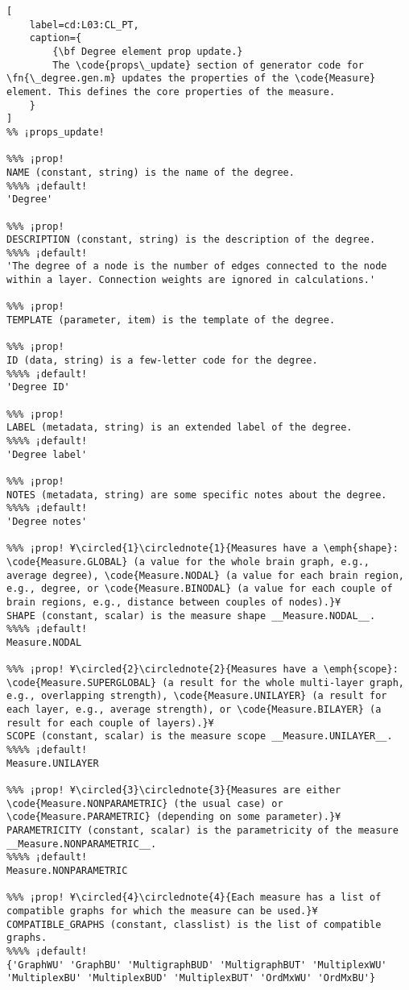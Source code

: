 \documentclass{tufte-handout}
\begin{document}
\begin{lstlisting}[
	label=cd:L03:CL_PT,
	caption={
		{\bf Degree element prop update.}
		The \code{props\_update} section of generator code for \fn{\_degree.gen.m} updates the properties of the \code{Measure} element. This defines the core properties of the measure.
	}
]
%% ¡props_update!

%%% ¡prop!
NAME (constant, string) is the name of the degree.
%%%% ¡default!
'Degree'

%%% ¡prop!
DESCRIPTION (constant, string) is the description of the degree.
%%%% ¡default!
'The degree of a node is the number of edges connected to the node within a layer. Connection weights are ignored in calculations.'

%%% ¡prop!
TEMPLATE (parameter, item) is the template of the degree.

%%% ¡prop!
ID (data, string) is a few-letter code for the degree.
%%%% ¡default!
'Degree ID'

%%% ¡prop!
LABEL (metadata, string) is an extended label of the degree.
%%%% ¡default!
'Degree label'

%%% ¡prop!
NOTES (metadata, string) are some specific notes about the degree.
%%%% ¡default!
'Degree notes'

%%% ¡prop! ¥\circled{1}\circlednote{1}{Measures have a \emph{shape}: \code{Measure.GLOBAL} (a value for the whole brain graph, e.g., average degree), \code{Measure.NODAL} (a value for each brain region, e.g., degree, or \code{Measure.BINODAL} (a value for each couple of brain regions, e.g., distance between couples of nodes).}¥
SHAPE (constant, scalar) is the measure shape __Measure.NODAL__.
%%%% ¡default!
Measure.NODAL

%%% ¡prop! ¥\circled{2}\circlednote{2}{Measures have a \emph{scope}: \code{Measure.SUPERGLOBAL} (a result for the whole multi-layer graph, e.g., overlapping strength), \code{Measure.UNILAYER} (a result for each layer, e.g., average strength), or \code{Measure.BILAYER} (a result for each couple of layers).}¥
SCOPE (constant, scalar) is the measure scope __Measure.UNILAYER__.
%%%% ¡default!
Measure.UNILAYER

%%% ¡prop! ¥\circled{3}\circlednote{3}{Measures are either \code{Measure.NONPARAMETRIC} (the usual case) or \code{Measure.PARAMETRIC} (depending on some parameter).}¥
PARAMETRICITY (constant, scalar) is the parametricity of the measure __Measure.NONPARAMETRIC__.
%%%% ¡default!
Measure.NONPARAMETRIC

%%% ¡prop! ¥\circled{4}\circlednote{4}{Each measure has a list of compatible graphs for which the measure can be used.}¥
COMPATIBLE_GRAPHS (constant, classlist) is the list of compatible graphs.
%%%% ¡default!
{'GraphWU' 'GraphBU' 'MultigraphBUD' 'MultigraphBUT' 'MultiplexWU' 'MultiplexBU' 'MultiplexBUD' 'MultiplexBUT' 'OrdMxWU' 'OrdMxBU'}


\end{lstlisting}
\end{document}
